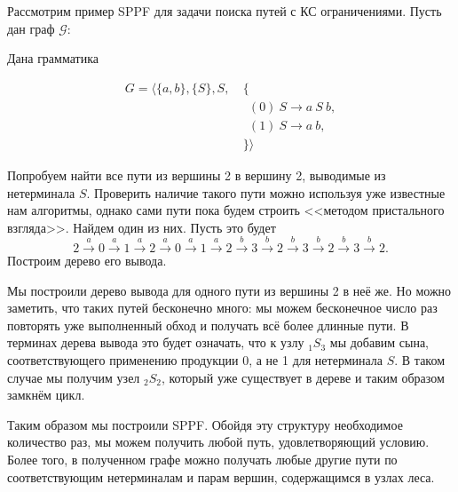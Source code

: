 \begin{example}
    Рассмотрим пример SPPF для задачи поиска путей с КС ограничениями.
    Пусть дан граф $\mathcal{G}:$

    \begin{center}
       
    \end{center}

    Дана грамматика

    \begin{align*}
        G = \langle \{a,b\}, \{S\},  S, \ & \{ \\
            & \ \ (0)\ S  \to a \ S \ b, \\
            & \ \ (1)\ S  \to a \ b, \\
            \ & \} \rangle
    \end{align*}


    Попробуем найти все пути из вершины 2 в вершину 2, выводимые из нетерминала $S$.
    Проверить наличие такого пути можно используя уже известные нам алгоритмы, однако сами пути пока будем строить <<методом пристального взгляда>>.  Найдем один из них. Пусть это будет
    \[ 2 \xrightarrow{a} 0 \xrightarrow{a} 1 \xrightarrow{a} 2 \xrightarrow{a} 0 \xrightarrow{a} 1 \xrightarrow{a} 2 \xrightarrow{b} 3 \xrightarrow{b} 2 \xrightarrow{b} 3 \xrightarrow{b} 2 \xrightarrow{b} 3 \xrightarrow{b} 2.
    \]
    Построим дерево его вывода.

    \begin{center}
    \resizebox{0.3\textwidth}{!}{
    
    }
    \end{center}

    Мы построили дерево вывода для одного пути из вершины 2 в неё же.
    Но можно заметить, что таких путей бесконечно много: мы можем бесконечное число раз повторять уже выполненный обход и получать всё более длинные пути.
    В терминах дерева вывода это будет  означать, что к узлу $_1S_3$ мы добавим сына, соответствующего применению продукции 0, а не 1 для нетерминала $S$.
    В таком случае мы получим узел $_2S_2$, который уже существует в дереве и таким образом замкнём цикл.

    \begin{center}
    \resizebox{0.5\textwidth}{!}{
    
    }
    \end{center}

    Таким образом мы построили SPPF. Обойдя эту структуру необходимое количество раз, мы можем получить любой путь, удовлетворяющий условию. Более того, в полученном графе можно получать любые другие пути по соответствующим нетерминалам и парам вершин, содержащимся в узлах леса.
    \end{example}

